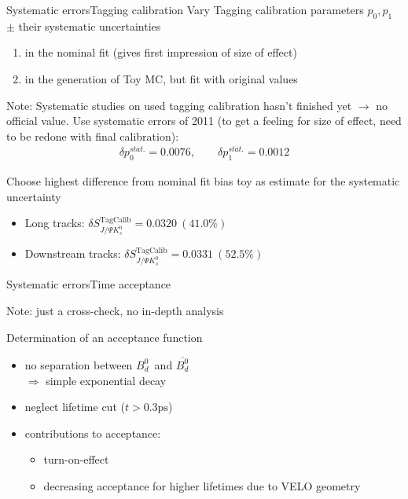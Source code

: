 \documentclass{beamer}
\newcommand{\Bd}{$B_d^0$}
\newcommand{\Bdbar}{$\overline{B_d^0}$}
\newcommand{\SJPsi}{S_{J/\Psi K_s^0}}
\begin{document}
	\begin{frame}{Systematic errors}{Tagging calibration}
	Vary Tagging calibration parameters $p_0, p_1$ $\pm$ their systematic uncertainties
	\begin{enumerate}
	\item in the nominal fit (gives first impression of size of effect)
	\item in the generation of Toy MC, but fit with original values
	\end{enumerate}
	\begin{alert}{Note:}
	Systematic studies on used tagging calibration hasn't finished yet $\longrightarrow$ no official value. Use systematic errors of 2011 (to get a feeling for size of effect, need to be redone with final calibration):
	\begin{align*}
	\delta p_0^{stat.} = 0.0076, \qquad \delta p_1^{stat.} = 0.0012
	\end{align*}
	\end{alert}
	Choose highest difference from nominal fit bias toy as estimate for the systematic uncertainty
	\begin{itemize}
	\item Long tracks: $\delta\SJPsi^{\text{TagCalib}} = 0.0320\ (41.0\%)$
	\item Downstream tracks: $\delta\SJPsi^{\text{TagCalib}} = 0.0331\ (52.5\%)$
    \end{itemize}		    
    \end{frame}
    
    \begin{frame}{Systematic errors}{Time acceptance}
    \begin{alert}{Note:}
    just a cross-check, no in-depth analysis
    \end{alert}
    \begin{block}{Determination of an acceptance function}
    \begin{itemize}
    \item no separation between \Bd \ and \Bdbar \\
          $\Rightarrow$ simple exponential decay
    \item neglect lifetime cut ($t > 0.3\text{ps}$)
    \item contributions to acceptance:
          \begin{itemize}
          \item turn-on-effect
          \item decreasing acceptance for higher lifetimes due to VELO geometry
          \end{itemize}
    \end{itemize}
    \end{block}
\end{frame}
\end{document}
